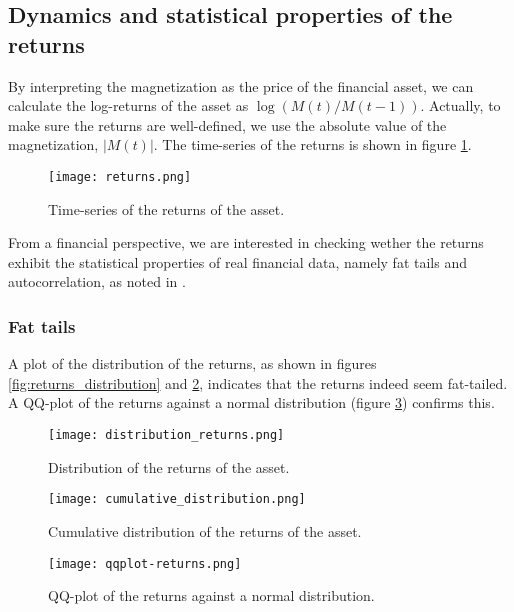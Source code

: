 \subsection{Dynamics and statistical properties of the returns}
By interpreting the magnetization as the price of the financial asset, we can calculate the log-returns of the asset as $\log(M(t)/M(t-1))$. Actually, to make sure the returns are well-defined, we use the absolute value of the magnetization, $|M(t)|$. The time-series of the returns is shown in figure \ref{fig:returns}.

\begin{figure}[H]
    \centering
    \texttt{[image: returns.png]}
    \caption{Time-series of the returns of the asset.}
    \label{fig:returns}
\end{figure}

From a financial perspective, we are interested in checking wether the returns exhibit the statistical properties of real financial data, namely fat tails and autocorrelation, as noted in \cite{bouchaud2000theory}.

\subsubsection{Fat tails}
A plot of the distribution of the returns, as shown in figures \ref{fig:returns_distribution} and \ref{fig:cumulative_returns_distribution}, indicates that the returns indeed seem fat-tailed. A QQ-plot of the returns against a normal distribution (figure \ref{fig:qqplot}) confirms this.

\begin{figure}[H]
    \centering
    \begin{minipage}{0.48\textwidth}
        \centering
        \texttt{[image: distribution\_returns.png]}
        \caption{Distribution of the returns of the asset.}
        \label{fig:returns_distribution}
    \end{minipage}
    \hfill
    \begin{minipage}{0.48\textwidth}
        \centering
        \texttt{[image: cumulative\_distribution.png]}
        \caption{Cumulative distribution of the returns of the asset.}
        \label{fig:cumulative_returns_distribution}
    \end{minipage}
\end{figure}


\begin{figure}[H]
    \centering
    \texttt{[image: qqplot-returns.png]}
    \caption{QQ-plot of the returns against a normal distribution.}
    \label{fig:qqplot}
\end{figure}

